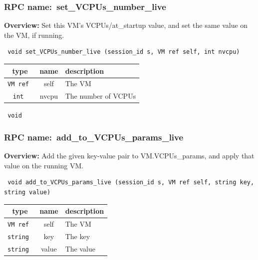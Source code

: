 \vspace{0.6cm}
\subsubsection{RPC name:~set\_VCPUs\_number\_live}

{\bf Overview:} 
Set this VM's VCPUs/at\_startup value, and set the same value on the VM, if
running.

\begin{verbatim} void set_VCPUs_number_live (session_id s, VM ref self, int nvcpu)\end{verbatim}



 
\vspace{0.3cm}
\begin{tabular}{|c|c|p{7cm}|}
 \hline
{\bf type} & {\bf name} & {\bf description} \\ \hline
{\tt VM ref } & self & The VM \\ \hline 

{\tt int } & nvcpu & The number of VCPUs \\ \hline 

\end{tabular}

\vspace{0.3cm}

{\tt 
void
}



\vspace{0.3cm}
\vspace{0.3cm}
\vspace{0.3cm}
\subsubsection{RPC name:~add\_to\_VCPUs\_params\_live}

{\bf Overview:} 
Add the given key-value pair to VM.VCPUs\_params, and apply that value on
the running VM.

\begin{verbatim} void add_to_VCPUs_params_live (session_id s, VM ref self, string key, string value)\end{verbatim}



 
\vspace{0.3cm}
\begin{tabular}{|c|c|p{7cm}|}
 \hline
{\bf type} & {\bf name} & {\bf description} \\ \hline
{\tt VM ref } & self & The VM \\ \hline 

{\tt string } & key & The key \\ \hline 

{\tt string } & value & The value \\ \hline 

\end{tabular}

